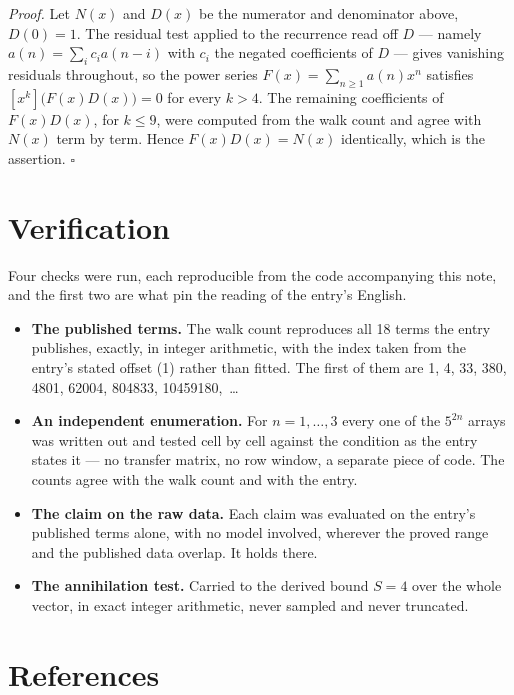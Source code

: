 \documentclass[11pt]{article}
\theoremstyle{definition}
\begin{document}
{\itshape Proof.} Let $N(x)$ and $D(x)$ be the numerator and denominator above, $D(0)=1$. The residual test applied to the recurrence read off $D$ --- namely $a(n) = \sum_i c_i a(n-i)$ with $c_i$ the negated coefficients of $D$ --- gives vanishing residuals throughout, so the power series $F(x)=\sum_{n\ge 1}a(n)x^n$ satisfies $[x^k]\bigl(F(x)D(x)\bigr) = 0$ for every $k > 4$. The remaining coefficients of $F(x)D(x)$, for $k \le 9$, were computed from the walk count and agree with $N(x)$ term by term. Hence $F(x)D(x) = N(x)$ identically, which is the assertion. $\square$

\section{Verification}

Four checks were run, each reproducible from the code accompanying this note, and the first two are what pin the reading of the entry's English.

\begin{itemize}

\item {\bfseries The published terms.} The walk count reproduces all 18 terms the entry publishes, exactly, in integer arithmetic, with the index taken from the entry's stated offset (1) rather than fitted. The first of them are 1, 4, 33, 380, 4801, 62004, 804833, 10459180,~\dots

\item {\bfseries An independent enumeration.} For $n = 1,\dots,3$ every one of the $5^{2n}$ arrays was written out and tested cell by cell against the condition as the entry states it --- no transfer matrix, no row window, a separate piece of code. The counts agree with the walk count and with the entry.

\item {\bfseries The claim on the raw data.} Each claim was evaluated on the entry's published terms alone, with no model involved, wherever the proved range and the published data overlap. It holds there.

\item {\bfseries The annihilation test.} Carried to the derived bound $S = 4$ over the whole vector, in exact integer arithmetic, never sampled and never truncated.

\end{itemize}

\section{References}
\end{document}

